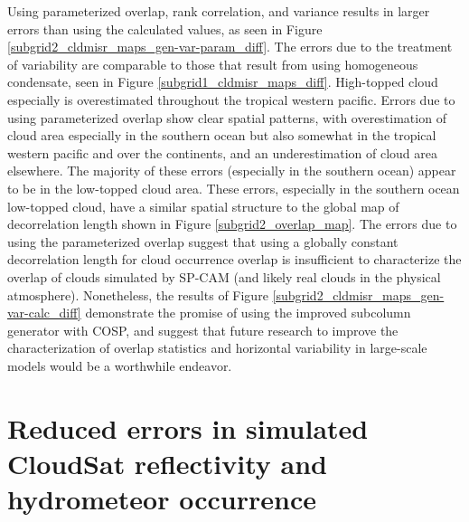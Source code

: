 Using parameterized overlap, rank correlation, and variance results in larger errors than using the calculated values, as seen in Figure \ref{subgrid2_cldmisr_maps_gen-var-param_diff}. The errors due to the treatment of variability are comparable to those that result from using homogeneous condensate, seen in Figure \ref{subgrid1_cldmisr_maps_diff}. High-topped cloud especially is overestimated throughout the tropical western pacific. Errors due to using parameterized overlap show clear spatial patterns, with overestimation of cloud area especially in the southern ocean but also somewhat in the tropical western pacific and over the continents, and an underestimation of cloud area elsewhere. The majority of these errors (especially in the southern ocean) appear to be in the low-topped cloud area. These errors, especially in the southern ocean low-topped cloud, have a similar spatial structure to the global map of decorrelation length shown in Figure \ref{subgrid2_overlap_map}. The errors due to using the parameterized overlap suggest that using a globally constant decorrelation length for cloud occurrence overlap is insufficient to characterize the overlap of clouds simulated by SP-CAM (and likely real clouds in the physical atmosphere). Nonetheless, the results of Figure \ref{subgrid2_cldmisr_maps_gen-var-calc_diff} demonstrate the promise of using the improved subcolumn generator with COSP, and suggest that future research to improve the characterization of overlap statistics and horizontal variability in large-scale models would be a worthwhile endeavor.

\section{Reduced errors in simulated CloudSat reflectivity and hydrometeor occurrence}
\label{subgrid2_active_section}

